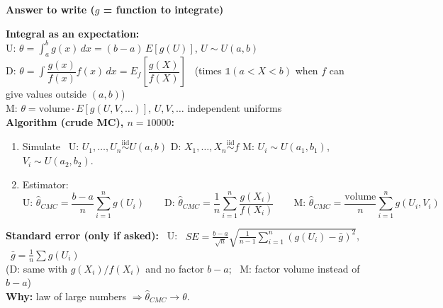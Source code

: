 \documentclass[10pt]{article}
\newcommand{\one}{\mathbb{1}}
\newcommand{\iid}{\overset{\text{iid}}{\sim}}
\newenvironment{answer}[1][Answer to write]{\par\vspace{2pt}\begin{shaded}\small\textbf{#1}\par\vspace{1pt}}{\end{shaded}\vspace{-2pt}}
\begin{document}
\begin{answer}[Answer to write \quad ($g$ = function to integrate)]
\textbf{Integral as an expectation:} \\
\hspace*{1em} U: $\theta=\int_a^b g(x)\,dx=(b-a)\,E[g(U)]$, $U\sim U(a,b)$\\
\hspace*{1em} D: $\theta=\int \dfrac{g(x)}{f(x)}f(x)\,dx=E_f\!\left[\dfrac{g(X)}{f(X)}\right]$ \ (times $\one(a<X<b)$ when $f$ can give values outside $(a,b)$)\\
\hspace*{1em} M: $\theta=\text{volume}\cdot E[g(U,V,\dots)]$, $U,V,\dots$ independent uniforms\\[2pt]
\textbf{Algorithm (crude MC), $n=10000$:}
\begin{enumerate}
\item Simulate \ U: $U_1,\dots,U_n\iid U(a,b)$ \quad D: $X_1,\dots,X_n\iid f$ \quad M: $U_i\sim U(a_1,b_1)$, $V_i\sim U(a_2,b_2)$.
\item Estimator:
\[\text{U: } \hat\theta_{CMC}=\frac{b-a}{n}\sum_{i=1}^n g(U_i) \qquad \text{D: } \hat\theta_{CMC}=\frac1n\sum_{i=1}^n\frac{g(X_i)}{f(X_i)} \qquad \text{M: } \hat\theta_{CMC}=\frac{\text{volume}}{n}\sum_{i=1}^n g(U_i,V_i)\]
\end{enumerate}
\textbf{Standard error (only if asked):} \ U: \ $\displaystyle SE=\frac{b-a}{\sqrt n}\sqrt{\frac1{n-1}\sum_{i=1}^n\left(g(U_i)-\bar g\right)^2}$, \ $\bar g=\frac1n\sum g(U_i)$\\
\hspace*{1em} (D: same with $g(X_i)/f(X_i)$ and no factor $b-a$; \ M: factor volume instead of $b-a$)\\[2pt]
\textbf{Why:} law of large numbers $\Rightarrow \hat\theta_{CMC}\to\theta$.
\end{answer}
\end{document}
